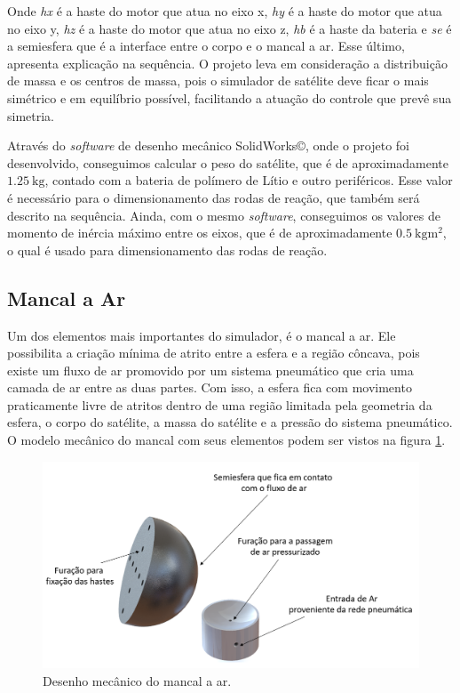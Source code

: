 Onde \textit{hx} é a haste do motor que atua no eixo x, \textit{hy} é a haste do motor que atua no eixo y, \textit{hz} é a haste do motor que atua no eixo z, \textit{hb} é a haste da bateria e \textit{se} é a semiesfera que é a interface entre o corpo e o mancal a ar. Esse último, apresenta explicação na sequência. O projeto leva em consideração a distribuição de massa e os centros de massa, pois o simulador de satélite deve ficar o mais simétrico e em equilíbrio possível, facilitando a atuação do controle que prevê sua simetria.

Através do \textit{software} de desenho mecânico SolidWorks\copyright, onde o projeto foi desenvolvido, conseguimos calcular o peso do satélite, que é de aproximadamente $\SI{1,25}{\kg}$, contado com a bateria de polímero de Lítio e outro periféricos. Esse valor é necessário para o dimensionamento das rodas de reação, que também será descrito na sequência. Ainda, com o mesmo \textit{software}, conseguimos os valores de momento de inércia máximo entre os eixos, que é de aproximadamente $\SI{0,5}{\kg\meter\squared}$, o qual é usado para dimensionamento das rodas de reação.



\subsection{Mancal a Ar}

Um dos elementos mais importantes do simulador, é o mancal a ar. Ele possibilita a criação mínima de atrito entre a esfera e a região côncava, pois existe um fluxo de ar promovido por um sistema pneumático que cria uma camada de ar entre as duas partes. Com isso, a esfera fica com movimento praticamente livre de atritos dentro de uma região limitada pela geometria da esfera, o corpo do satélite, a massa do satélite e a pressão do sistema pneumático. O modelo mecânico do mancal com seus elementos podem ser vistos na figura \ref{fig:base_desenho}.

\begin{figure}[H]
  \caption{Desenho mecânico do mancal a ar.}
  \begin{center}
      \includegraphics[scale=.4]{metodologia/img/base_desenho}
  \end{center}
  \label{fig:base_desenho}
\end{figure}

